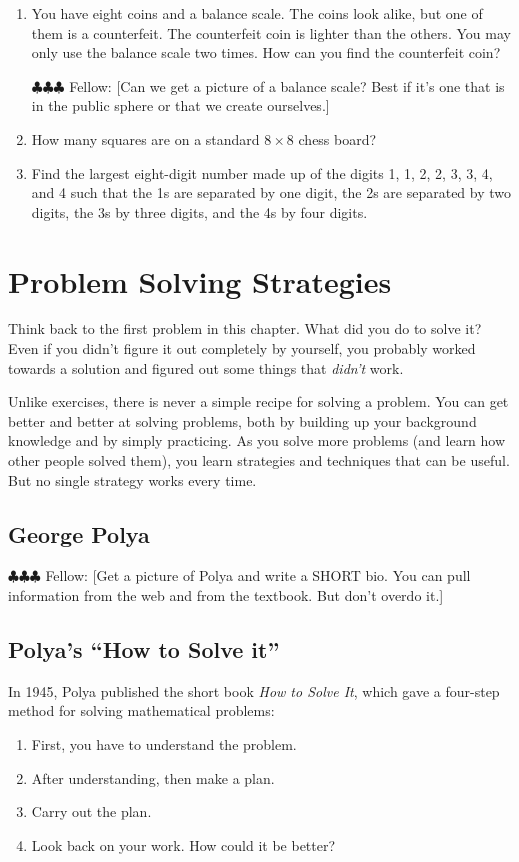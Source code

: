 \documentclass[10pt, reqno]{amsart}
\theoremstyle{remark}
\theoremstyle{definition}
\numberwithin{equation}{section}  %
\newcommand{\fellow}[1]{{\color{magenta} \sf $\clubsuit\clubsuit\clubsuit$ Fellow: [#1]}}
\begin{document}
\begin{enumerate}
\item
You have eight coins and a balance scale.  The coins look alike, but one of them is a counterfeit.  The counterfeit coin is lighter than the others.  You may only use the balance scale two times.  How can you find the counterfeit coin?

\fellow{Can we get a picture of a balance scale?  Best if it's one that is in the public sphere or that we create ourselves.}

\item
How many squares are on a standard $8 \times 8$ chess board?


\item
Find the largest eight-digit number made up of the digits 1, 1, 2, 2, 3, 3, 4, and 4 such that the 1s are separated by one digit, the 2s are separated by two digits, the 3s by three digits, and the 4s by four digits.

\end{enumerate}


\section{Problem Solving Strategies}
Think back to the first problem in this chapter.  What did you do to solve it?  Even if you didn't figure it out completely by yourself, you probably worked towards a solution and figured out some things that \emph{didn't} work.   

Unlike exercises, there is never a simple recipe for solving a problem.  You can get better and better at solving problems, both by building up your background knowledge and by simply practicing.  As you solve more problems (and learn how other people solved them), you learn strategies and techniques that can be useful.  But no single strategy works every time. 

\subsection{George Polya}
\fellow{Get a picture of Polya and write a SHORT bio.  You can pull information from the web and from the textbook.  But don't overdo it.}

\subsection{Polya's ``How to Solve it''}
In 1945, Polya published the short book \emph{How to Solve It}, which gave a four-step method for solving mathematical problems:
\begin{enumerate}
\item
First, you have to understand the problem.
\item
After understanding, then make a plan.
\item
Carry out the plan.
\item
Look back on your work. How could it be better?
\end{enumerate}
\end{document}
